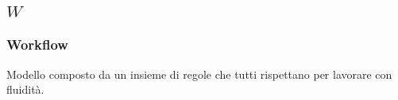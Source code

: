 \subsection*{\quad$W\quad$}

\subsubsection*{Workflow}
Modello composto da un insieme di regole che tutti rispettano per lavorare con fluidità.

